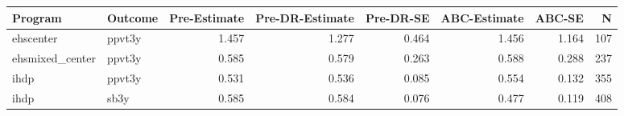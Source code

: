 \begin{table}[ht]
\centering
\begin{tabular}{llrrrrrr}
  \hline
Program & Outcome & Pre-Estimate & Pre-DR-Estimate & Pre-DR-SE & ABC-Estimate & ABC-SE & N \\ 
  \hline
ehscenter & ppvt3y & 1.457 & 1.277 & 0.464 & 1.456 & 1.164 & 107 \\ 
  ehsmixed\_center & ppvt3y & 0.585 & 0.579 & 0.263 & 0.588 & 0.288 & 237 \\ 
  ihdp & ppvt3y & 0.531 & 0.536 & 0.085 & 0.554 & 0.132 & 355 \\ 
  ihdp & sb3y & 0.585 & 0.584 & 0.076 & 0.477 & 0.119 & 408 \\ 
   \hline
\end{tabular}
\end{table}
